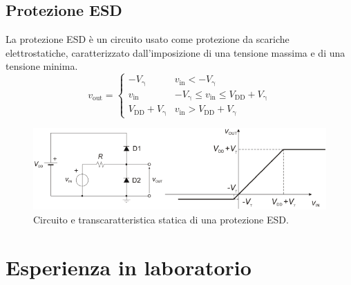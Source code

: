\documentclass[a4paper]{article}
\begin{document}
		\subsection{Protezione ESD}
			La protezione ESD è un circuito usato come protezione da scariche elettrostatiche, caratterizzato dall'imposizione di una tensione massima e di una tensione minima.
			\begin{equation*}
				v_{\mathrm{out}} =
				\begin{cases}
					-V_{\mathrm{\gamma}}				  & v_{\mathrm{in}} < -V_{\mathrm{\gamma}} \\
					v_{\mathrm{in}} 				 	  & -V_{\mathrm{\gamma}} \le v_{\mathrm{in}} \le V_{\mathrm{DD}} + V_{\mathrm{\gamma}} \\
					V_{\mathrm{DD}} + V_{\mathrm{\gamma}} & v_{\mathrm{in}} > V_{\mathrm{DD}} + V_{\mathrm{\gamma}}
				\end{cases}
			\end{equation*}
			\begin{figure}[h!]
				\centering
				\includegraphics[scale=0.7]{transcaratteristicaStaticaProtezioneESD}
				\caption{Circuito e transcaratteristica statica di una protezione ESD.}
				\label{fig:transcaratteristicaStaticaProtezioneESD}
			\end{figure}
	\section{Esperienza in laboratorio}
\end{document}
